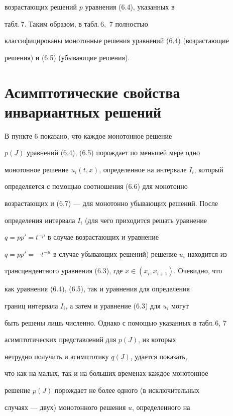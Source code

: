 возрастающих решений $p$ уравнения (6.4), указанных в  


табл.\,7. Таким образом, в табл.\,6,~7 полностью 


классифицированы монотонные решения уравнений (6.4) (возрастающие  


решения) и (6.5) (убывающие решения). 


 


 


\section{Асимптотические свойства инвариантных решений} 


 


В пункте 6 показано, что каждое монотонное решение  


$p(J)$ уравнений (6.4), (6.5) порождает по меньшей мере одно 


монотонное решение $u_i(t,x)$, определенное на интервале $I_i$, который  


определяется с помощью соотношения (6.6) для монотонно 


возрастающих  и (6.7) --- для монотонно убывающих решений. После  


определения интервала $I_i$ (для чего приходится решать уравнение  


$q=pp'=t^{-\mu}$ в случае возрастающих  и уравнение  


$q=pp'=-t^{-\mu}$ в случае убывающих решений) решение $u_i$ находится из 


трансцендентного уравнения (6.3), где $x\in(x_i,x_{i+1})$. Очевидно, что 


как уравнения (6.4), (6.5), так и уравнения для определения 


границ интервала $I_i$, а затем и уравнение (6.3) для $u_i$ могут 


быть решены лишь численно. Однако с помощью указанных в табл.\,6, 7 


асимптотических представлений для $p(J)$, из которых 


нетрудно получить и асимптотику $q(J)$, удается показать,  


что как на малых, так и на больших временах каждое монотонное  


решение $p(J)$ порождает не более одного (в исключительных 


случаях --- двух) монотонного решения $u$, определенного на  


